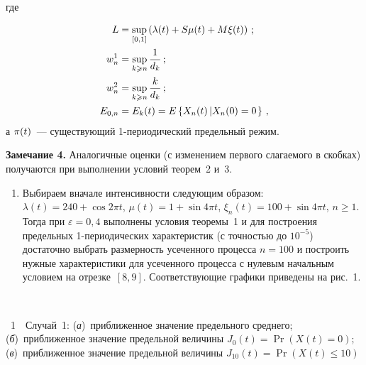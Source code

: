 \begin{multicols}{2}
\noindent
где
\vspace*{-6pt}

\noindent
\begin{align*}
L &= \sup\limits_{[0,1]} \left(\lambda(t)+S\mu(t)+M\xi(t)\right)\,; \\
w_n^1 &=\sup\limits_{k\geqslant n} \displaystyle\frac{\displaystyle 1\mathstrut}{\displaystyle d_k\mathstrut}\,;\\
 w_n^2 &= \sup\limits_{k\geqslant n} \displaystyle\frac{\displaystyle k\mathstrut}{\displaystyle d_k\mathstrut}\,;\\
E_{0,n} &=E_k(t) = E\left\{X_n(t)\left|X_n(0)=0\right.\right\}\,,
\end{align*}
а  ${\bf \pi} (t)$~--- существующий 1-пе\-ри\-о\-ди\-че\-ский предельный режим.

\medskip

\noindent
\textbf{Замечание 4.}
Аналогичные оценки (с изменением первого слагаемого в скобках) получаются при выполнении условий теорем~2 и~3.

\bigskip

\noindent
\begin{enumerate}[1.]
\item Выбираем вначале интенсивности следующим образом:
$\lambda(t) = 240+\cos 2\pi t $, $\mu(t) = 1 + \sin 4\pi t $, $\xi_n(t)=100 + \sin 4 \pi t$, $n \ge 1$.
Тогда при $\varepsilon =0{,}4$ выполнены условия теоремы~1 и для построения предельных 1-периодических
характеристик (с точностью до $10^{-5}$) достаточно выбрать размерность усеченного процесса $n=100$
и построить нужные характеристики для усеченного процесса с нулевым начальным условием на отрезке~$[8,9]$.
Соответствующие графики приведены на рис.~1.
\end{enumerate}

\vspace*{6pt}
\begin{center}
\vspace*{1pt}
\mbox{%
\epsfxsize=80.672mm
\hspace*{-.7pt}
}
\end{center}
{{\figurename~1}\ \ \small{Случай~1:
(\textit{а})~приближенное значение предельного среднего;
(\textit{б})~приближенное значение предельной величины $J_{0}(t)= \Pr\left(X(t)  = 0\right)$;
(\textit{в})~приближенное значение предельной величины $J_{10}(t)= \Pr\left(X(t) \le 10\right)$
}}

\end{multicols}

